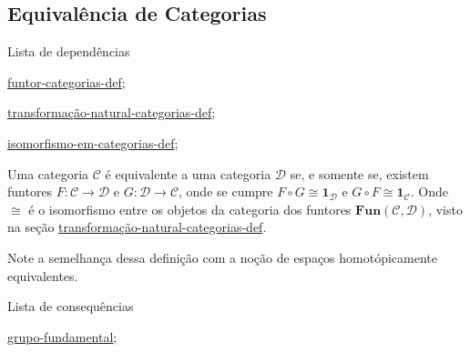 \subsection{Equivalência de Categorias}
\label{equivalência-de-categorias-def}
\begin{titlemize}{Lista de dependências}
	\item \hyperref[funtor-categorias-def]{funtor-categorias-def};\\ %
	\item \hyperref[transformação-natural-categorias-def]{transformação-natural-categorias-def};\\
  \item \hyperref[isomorfismo-em-categorias-def]{isomorfismo-em-categorias-def};\\
\end{titlemize}
\begin{defi}
	Uma categoria $\mathcal{C}$ é equivalente a uma categoria $\mathcal{D}$ se, e somente se, existem funtores $F: \mathcal{C} \longrightarrow \mathcal{D}$ e $G: \mathcal{D} \longrightarrow \mathcal{C}$, onde se cumpre $F \circ G \cong \mathbf{1}_\mathcal{D}$ e $G \circ F \cong \mathbf{1}_\mathcal{C}$.
 Onde $\cong$ é o isomorfismo entre os objetos da categoria dos funtores $\mathbf{Fun(\mathcal{C}, \mathcal{D})}$, visto na seção \hyperref[transformação-natural-categorias-def]{transformação-natural-categorias-def}.
\end{defi}

Note a semelhança dessa definição com a noção de espaços homotópicamente equivalentes.

\begin{titlemize}{Lista de consequências}
	\item \hyperref[grupo-fundamental]{grupo-fundamental};\\ %
	\item \hyperref[]{}
\end{titlemize}

